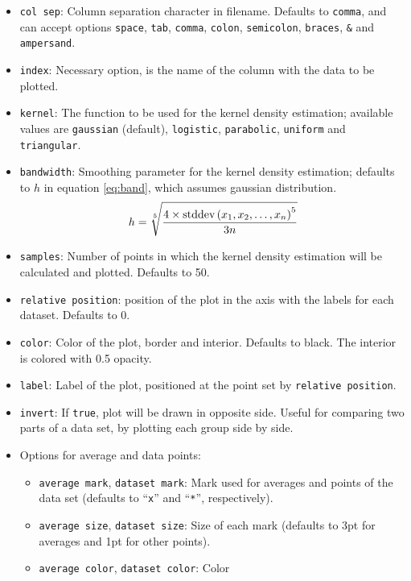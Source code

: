 \documentclass{article}
\begin{document}
\begin{itemize}
	\item \texttt{col sep}: Column separation character in filename.
		Defaults to \texttt{comma}, and can accept options
		\texttt{space}, \texttt{tab}, \texttt{comma},
		\texttt{colon}, \texttt{semicolon}, \texttt{braces},
		\texttt{\&} and \texttt{ampersand}.
	\item \texttt{index}: Necessary option, is the name of the column with
		the data to be plotted.
	\item \texttt{kernel}: The function to be used for the kernel density
		estimation; available values are \texttt{gaussian} (default),
		\texttt{logistic}, \texttt{parabolic}, \texttt{uniform}
		and \texttt{triangular}.
	\item \texttt{bandwidth}: Smoothing parameter for the kernel density
		estimation; defaults to $h$ in equation \ref{eq:band},
		which assumes gaussian distribution.
		\begin{equation}
			\label{eq:band}
			h=\sqrt[5]{\frac{4\times\textnormal{stddev}%
			\left(x_1,x_2,\ldots,x_n\right)^5}{3n}}
		\end{equation}
	\item \texttt{samples}: Number of points in which the kernel density
		estimation will be calculated and plotted. Defaults
		to 50.
	\item \texttt{relative position}: position of the plot in the axis
		with the labels for each dataset. Defaults to 0.
	\item \texttt{color}: Color of the plot, border and interior.
		Defaults to black. The interior is colored with 0.5
		opacity.
	\item \texttt{label}: Label of the plot, positioned at the point
		set by \texttt{relative position}.
	\item \texttt{invert}: If \texttt{true}, plot will be drawn in opposite
		side. Useful for comparing two parts of a data set, by plotting each
		group side by side.
	\item Options for average and data points:
	\begin{itemize}
		\item \texttt{average mark}, \texttt{dataset mark}: Mark used
			for averages and points of the data set (defaults
			to ``\texttt{x}'' and ``\texttt{*}'', respectively).
		\item \texttt{average size}, \texttt{dataset size}: Size
			of each mark (defaults to 3pt for averages and 1pt
			for other points).
		\item \texttt{average color}, \texttt{dataset color}: Color

\end{itemize}
\end{itemize}
\end{document}
